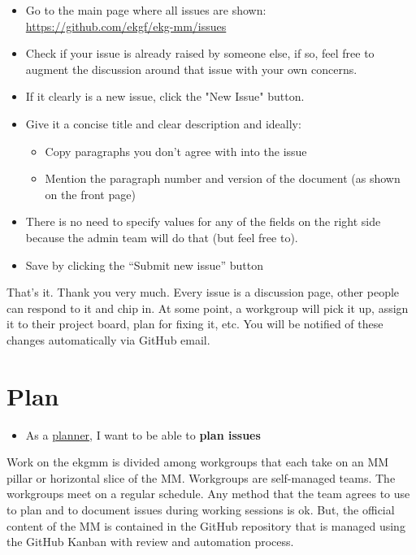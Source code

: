 \begin{itemize}
    \item Go to the main page where all issues are shown:
          \url{https://github.com/ekgf/ekg-mm/issues}
    \item Check if your issue is already raised by someone else, if so, 
          feel free to augment the discussion around that issue with your own concerns.
    \item If it clearly is a new issue, click the "New Issue" button.
    \item Give it a concise title and clear description and ideally:
    \begin{itemize}
        \item Copy paragraphs you don’t agree with into the issue
        \item Mention the paragraph number and version of the document (as shown on the front page) 
    \end{itemize}
    \item There is no need to specify values for any of the fields on
          the right side because the admin team will do that (but feel free to).
    \item Save by clicking the “Submit new issue” button
\end{itemize}

That’s it. Thank you very much. Every issue is a discussion page,
other people can respond to it and chip in. 
At some point, a workgroup will pick it up, assign it to their project board, 
plan for fixing it, etc. You will be notified of these changes 
automatically via GitHub email.

\section{Plan}
\label{sec:ekg-mm-process-plan}

\begin{tcolorbox}[colback=secondary!5,colframe=secondary!80,title=\textbf{User Stories}]
    \begin{itemize}[leftmargin=1em]
        \item As a \underline{planner}, I want to be able to \textbf{plan issues}
    \end{itemize}
\end{tcolorbox}

Work on the \gls{ekgmm} is divided among workgroups that each take on an MM pillar
or horizontal slice of the MM. 
Workgroups are self-managed teams. 
The workgroups meet on a regular schedule. 
Any method that the team agrees to use to plan and to document issues during 
working sessions is ok. 
But, the official content of the MM is contained in the GitHub repository 
that is managed using the GitHub Kanban with review and automation process.

